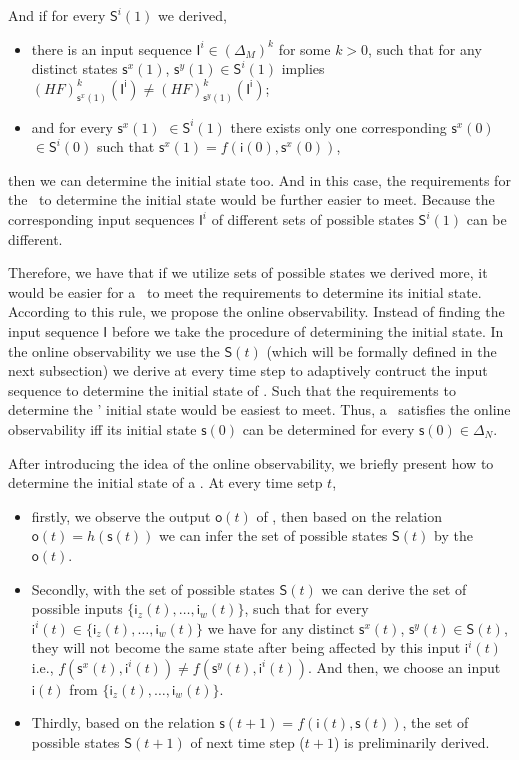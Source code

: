 And if for every $\mathsf{S}^{i}(1)$ we derived, 
\begin{itemize}
  \item  there is an input sequence $\mathsf{I}^{i}\in(\Delta_M)^k$ for some $k>0$, such that for any distinct states $\mathsf{s}^{x}(1)$, $\mathsf{s}^{y}(1) \in \mathsf{S}^{i}(1)$ implies $(HF)^k_{\mathsf{s}^{x}(1)}(\mathsf{I^i})\neq (HF)^k_{\mathsf{s}^{y}(1)}(\mathsf{I^i})$;
  \item  and for every $\mathsf{s}^{x}(1)$ $\in \mathsf{S}^{i}(1)$ there exists only one corresponding $\mathsf{s}^{x}(0)$ $\in \mathsf{S}^{i}(0)$ such that $\mathsf{s}^{x}(1)=f({\mathsf{i}(0)},{\mathsf{s}^{x}(0)})$,
\end{itemize} 
then we can determine the initial state too. And in this case, the requirements for the \BCN\ to determine the initial state would be further easier to meet. Because the corresponding input sequences $\mathsf{I}^{i}$ of different sets of possible states $\mathsf{S}^{i}(1)$ can be different. 

Therefore, we have that if we utilize sets of possible states we derived more, it would be easier for a \BCN\ to meet the requirements to determine its initial state. According to this rule, we propose the online observability. Instead of finding the input sequence $\mathsf{I}$ before we take the procedure of determining the initial state. In the online observability we use the $\mathsf{S}(t)$ (which will be formally defined in the next subsection) we derive at every time step to adaptively contruct the input sequence to determine the initial state of \BCNs. Such that the requirements to determine the \BCNs' initial state would be easiest to meet. Thus, a \BCN\ satisfies the online observability iff its initial state $\mathsf{s}(0)$ can be determined for every $\mathsf{s}(0) \in \Delta_N$.

After introducing the idea of the online observability, we briefly present how to determine the initial state of a \BCN. At every time setp $t$, 
\begin{itemize}
\item firstly, we observe the output $\mathsf{o}(t)$ of \BCN, then based on the relation $\mathsf{o}(t)=h(\mathsf{s}(t))$ we can infer the set of possible states $\mathsf{S}(t)$ by the $\mathsf{o}(t)$.
\item Secondly, with the set of possible states $\mathsf{S}(t)$ we can derive the set of possible inputs $\{\mathsf{i}_z(t),\ldots,\mathsf{i}_w(t)\}$, such that for every $\mathsf{i}^{i}(t)\in \{\mathsf{i}_z(t),\ldots,\mathsf{i}_w(t)\}$ we have  for any distinct $\mathsf{s}^{x}(t)$, $\mathsf{s}^{y}(t) \in \mathsf{S}(t)$, they will not become the same state after being affected by this input $\mathsf{i}^{i}(t)$ i.e., $f(\mathsf{s}^{x}(t), \mathsf{i}^{i}(t))\neq f(\mathsf{s}^{y}(t),\mathsf{i}^{i}(t))$.  And then, we choose an input $\mathsf{i}(t)$ from $\{\mathsf{i}_z(t),\ldots,\mathsf{i}_w(t)\}$.
\item Thirdly, based on the relation $\mathsf{s}(t+1)= f({\mathsf{i}(t)},{\mathsf{s}(t)})$, the set of possible states $\mathsf{S}(t+1)$ of next time step ($t+1$) is preliminarily derived. 
\end{itemize} 

